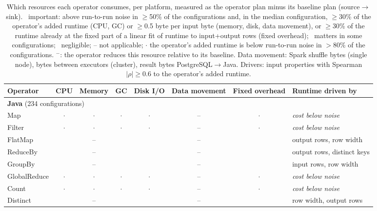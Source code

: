 \providecommand{\high}{\CIRCLE}\providecommand{\some}{\LEFTcircle}\providecommand{\low}{\Circle}
\begin{table}[t]
\centering\small
\caption{Which resources each operator consumes, per platform, measured as the operator plan minus its baseline plan (source$\to$sink). \high\ important: above run-to-run noise in $\geq$50\% of the configurations and, in the median configuration, $\geq$30\% of the operator's added runtime (CPU, GC) or $\geq$0.5 byte per input byte (memory, disk, data movement), or $\geq$30\% of the runtime already at the fixed part of a linear fit of runtime to input+output rows (fixed overhead); \some\ matters in some configurations; \low\ negligible; -- not applicable; $\cdot$ the operator's added runtime is below run-to-run noise in $>$80\% of the configurations. $^{-}$: the operator reduces this resource relative to its baseline. Data movement: Spark shuffle bytes (single node), bytes between executors (cluster), result bytes PostgreSQL$\to$Java. Drivers: input properties with Spearman $|\rho|\geq 0.6$ to the operator's added runtime.}
\label{tab:resource-importance}
\begin{tabular}{lccccccl}
\toprule
Operator & CPU & Memory & GC & Disk I/O & Data movement & Fixed overhead & Runtime driven by \\
\midrule
\multicolumn{8}{l}{\textbf{Java} \footnotesize(234 configurations)} \\
Map & $\cdot$ & $\cdot$ & $\cdot$ & $\cdot$ & -- & $\cdot$ & \emph{cost below noise} \\
Filter & $\cdot$ & $\cdot$ & $\cdot$ & $\cdot$ & -- & $\cdot$ & \emph{cost below noise} \\
FlatMap & \high & -- & \low & \low & -- & \low & output rows, row width \\
ReduceBy & \high & -- & \low & \low & -- & \low & output rows, distinct keys \\
GroupBy & \high & -- & \low & \low & -- & \low & input rows, row width \\
GlobalReduce & $\cdot$ & $\cdot$ & $\cdot$ & $\cdot$ & -- & $\cdot$ & \emph{cost below noise} \\
Count & $\cdot$ & $\cdot$ & $\cdot$ & $\cdot$ & -- & $\cdot$ & \emph{cost below noise} \\
Distinct & \some & -- & \low & \low & -- & \low & row width, output rows \\

\end{tabular}
\end{table}
